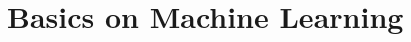 \documentclass[aspectratio=169]{beamer}
\begin{document}
% 
% 
% 
% 


\section{Basics on Machine Learning}
\end{document}
